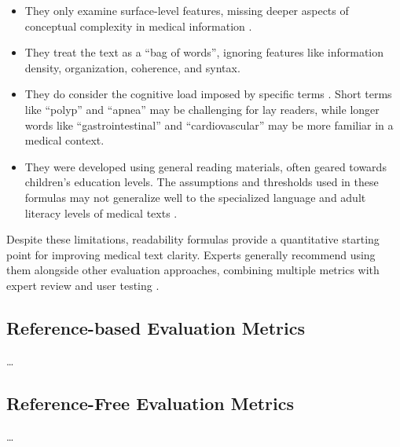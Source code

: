 \begin{itemize}
    \item They only examine surface-level features, missing deeper aspects of conceptual complexity in medical information \cite{Crossley2022, WANG2013503, Singh2024}.
    
    \item They treat the text as a ``bag of words'', ignoring features like information density, organization, coherence, and syntax.
    
    \item They do consider the cognitive load imposed by specific terms \cite{Swanson2024}. Short terms like ``polyp'' and ``apnea'' may be challenging for lay readers, while longer words like ``gastrointestinal'' and ``cardiovascular'' may be more familiar in a medical context.
    
    \item They were developed using general reading materials, often geared towards children's education levels. The assumptions and thresholds used in these formulas may not generalize well to the specialized language and adult literacy levels of medical texts \cite{Crossley2022}.

\end{itemize}

Despite these limitations, readability formulas provide a quantitative starting point for improving medical text clarity. Experts generally recommend using them alongside other evaluation approaches, combining multiple metrics with expert review and user testing \cite{Ko2024-dd, tanprasert-kauchak-2021-flesch}.

\subsection{Reference-based Evaluation Metrics}
\dots

\subsection{Reference-Free Evaluation Metrics}
\dots
